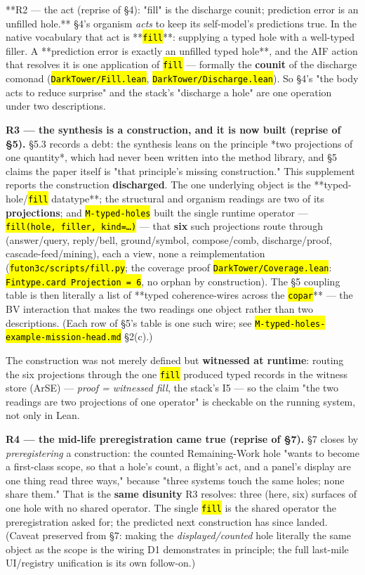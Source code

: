 \documentclass[11pt,oneside]{article}
\newcommand{\scopehl}[1]{\texttt{\hl{#1}}}
\begin{document}
**R2 --- the act (reprise of \S{}4): "fill" is the discharge counit; prediction
error is an unfilled hole.** \S{}4's organism \emph{acts} to keep its self-model's
predictions true. In the native vocabulary that act is **\scopehl{fill}**: supplying a
typed hole with a well-typed filler. A **prediction error is exactly an
unfilled typed hole**, and the AIF action that resolves it is one application of
\scopehl{fill} --- formally the \textbf{counit} of the discharge comonad (\scopehl{DarkTower/Fill.lean},
\scopehl{DarkTower/Discharge.lean}). So \S{}4's "the body acts to reduce surprise" and the
stack's "discharge a hole" are one operation under two descriptions.

\textbf{R3 --- the synthesis is a construction, and it is now built (reprise of \S{}5).}
\S{}5.3 records a debt: the synthesis leans on the principle *two projections of
one quantity*, which had never been written into the method library, and \S{}5
claims the paper itself is "that principle's missing construction." This
supplement reports the construction \textbf{discharged}. The one underlying object is
the **typed-hole/\scopehl{fill} datatype**; the structural and organism readings are two
of its \textbf{projections}; and \scopehl{M-typed-holes} built the single runtime
operator --- \scopehl{fill(hole, filler, kind=\ldots{})} --- that \textbf{six} such projections route
through (answer/query, reply/bell, ground/symbol, compose/comb, discharge/proof,
cascade-feed/mining), each a view, none a reimplementation
(\scopehl{futon3c/scripts/fill.py}; the coverage proof \scopehl{DarkTower/Coverage.lean}:
\scopehl{Fintype.card Projection = 6}, no orphan by construction). The \S{}5 coupling table
is then literally a list of **typed coherence-wires across the \scopehl{copar}** --- the
BV interaction that makes the two readings one object rather than two
descriptions. (Each row of \S{}5's table is one such wire; see
\scopehl{M-typed-holes-example-mission-head.md} \S{}2(c).)

The construction was not merely defined but \textbf{witnessed at runtime}: routing the
six projections through the one \scopehl{fill} produced typed records in the witness
store (ArSE) --- \emph{proof = witnessed fill}, the stack's I5 --- so the claim "the two
readings are two projections of one operator" is checkable on the running system,
not only in Lean.

\textbf{R4 --- the mid-life preregistration came true (reprise of \S{}7).} \S{}7 closes by
\emph{preregistering} a construction: the counted Remaining-Work hole "wants to become
a first-class scope, so that a hole's count, a flight's act, and a panel's
display are one thing read three ways," because "three systems touch the same
holes; none share them." That is the \textbf{same disunity} R3 resolves: three (here,
six) surfaces of one hole with no shared operator. The single \scopehl{fill} is the
shared operator the preregistration asked for; the predicted next construction
has since landed. (Caveat preserved from \S{}7: making the \emph{displayed/counted} hole
literally the same object as the scope is the wiring D1 demonstrates in principle;
the full last-mile UI/registry unification is its own follow-on.)
\end{document}
